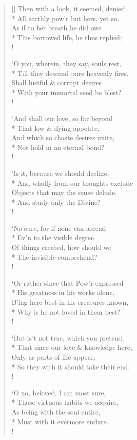 \documentclass[MAIN]{subfiles}
\begin{document}
\begin{verse}[\versewidth]
Then with a look, it seemed, denied\\*
\vin All earthly pow'r but hers, yet so,\\
\vin As if to her breath he did owe\\*
This borrowed life, he thus replied;\\!

`O you, wherein, they say, souls rest,\\*
\vin Till they descend pure heavenly fires,\\
\vin Shall lustful \& corrupt desires\\*
With your immortal seed be blest?\\!

`And shall our love, so far beyond\\*
\vin That low \& dying appetite,\\
\vin And which so chaste desires unite,\\*
Not hold in an eternal bond?\\!

`Is it, because we should decline,\\*
\vin And wholly from our thoughts exclude\\
\vin Objects that may the sense delude,\\*
And study only the Divine?\\!

`No sure, for if none can ascend\\*
\vin Ev'n to the visible degree\\
\vin Of things created, how should we\\*
The invisible comprehend?\\! 

`Or rather since that Pow'r expressed\\*
\vin His greatness in his works alone,\\
\vin B'ing here best in his creatures known,\\*
Why is he not loved in them best?\\!

`But is't not true, which you pretend,\\*
\vin That since our love \& knowledge here,\\
\vin Only as parts of life appear,\\*
So they with it should take their end.\\!

`O no, beloved, I am most sure,\\*
\vin Those virtuous habits we acquire,\\
\vin As being with the soul entire,\\*
Must with it evermore endure.\\!


\end{verse}
\end{document}
